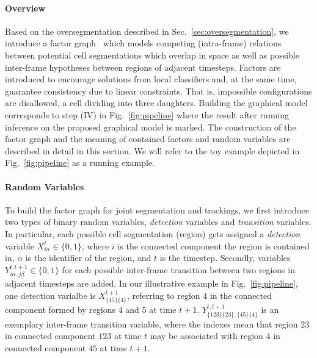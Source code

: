 \documentclass[10pt,twocolumn,letterpaper]{article}
\begin{document}
\paragraph{Overview} Based on the oversegmentation described in Sec.~\ref{sec:oversegmentation},
we introduce a factor graph~\cite{kschischang_01_factor} which models competing (intra-frame) relations between
potential cell segmentations which overlap in space %
as well as possible inter-frame hypotheses
between regions of adjacent timesteps. Factors are introduced to encourage solutions from local classifiers
and, at the same time, guarantee consistency due to
linear constraints. That is, impossible configurations are disallowed, \eg a
cell dividing into three daughters. Building the graphical model corresponds to step
(IV) in Fig.~\ref{fig:pipeline} where the result after running inference on the proposed graphical
model is marked. 
The construction of the factor graph and the meaning of contained factors and random variables are
described in detail in this section. 
We will refer to the toy example depicted in Fig.~\ref{fig:pipeline} as a running example.

\paragraph{Random Variables} 
To build the factor graph for joint segmentation and trackings, we first introduce two types of binary
random variables, \emph{detection} variables and \emph{transition} variables.
In particular,
each possible cell segmentation (region) 
gets assigned a \emph{detection} variable $X_{i\alpha}^t \in \{0,1\}$, where $i$ is the
connected component the region is contained in, $\alpha$ is the identifier of the region, and $t$ is the
timestep. Secondly, variables $Y_{i\alpha,j\beta}^{t,t+1} \in \{0,1\}$ for each possible inter-frame transition 
between two regions in adjacent timesteps are added.
In our illustrative example in Fig.~\ref{fig:pipeline}, %
one detection varialbe is $X_{\{45\}\{4\}}^{t+1}$, referring to region $4$ in the connected component formed by
regions $4$ and $5$ at time $t+1$.
$Y_{\{123\}\{23\},\{45\}\{4\}}^{t,t+1}$ is an exemplary inter-frame transition variable, where the indexes mean that 
region $23$ in connected component $123$ at time $t$ may be associated with region $4$ in connected component $45$ at time
$t+1$.
\end{document}
